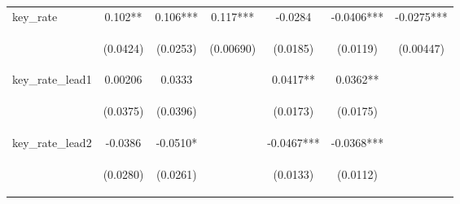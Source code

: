 \begin{tabular}{lcccccc}
key\_rate & 0.102** & 0.106*** & 0.117*** & -0.0284 & -0.0406*** & -0.0275*** \\
\vspace{4pt} & \begin{footnotesize}(0.0424)\end{footnotesize} & \begin{footnotesize}(0.0253)\end{footnotesize} & \begin{footnotesize}(0.00690)\end{footnotesize} & \begin{footnotesize}(0.0185)\end{footnotesize} & \begin{footnotesize}(0.0119)\end{footnotesize} & \begin{footnotesize}(0.00447)\end{footnotesize} \\
key\_rate\_lead1 & 0.00206 & 0.0333 &  & 0.0417** & 0.0362** &  \\
\vspace{4pt} & \begin{footnotesize}(0.0375)\end{footnotesize} & \begin{footnotesize}(0.0396)\end{footnotesize} & \begin{footnotesize}\end{footnotesize} & \begin{footnotesize}(0.0173)\end{footnotesize} & \begin{footnotesize}(0.0175)\end{footnotesize} & \begin{footnotesize}\end{footnotesize} \\
key\_rate\_lead2 & -0.0386 & -0.0510* &  & -0.0467*** & -0.0368*** &  \\
\vspace{4pt} & \begin{footnotesize}(0.0280)\end{footnotesize} & \begin{footnotesize}(0.0261)\end{footnotesize} & \begin{footnotesize}\end{footnotesize} & \begin{footnotesize}(0.0133)\end{footnotesize} & \begin{footnotesize}(0.0112)\end{footnotesize} & \begin{footnotesize}\end{footnotesize} \\

\end{tabular}
